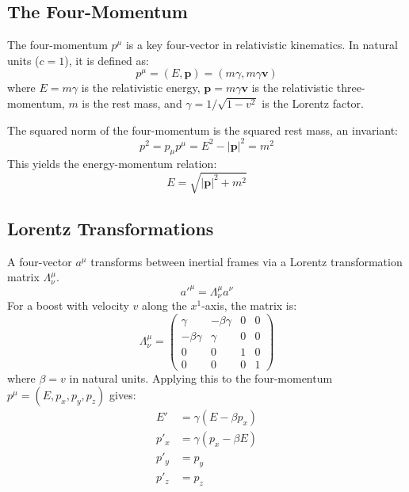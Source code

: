 \documentclass[a4paper,oneside,article]{memoir}
\begin{document}
\subsection{The Four-Momentum}
The four-momentum $p^\mu$ is a key four-vector in relativistic kinematics. In natural units ($c=1$), it is defined as:
\begin{equation}
p^\mu = (E, \mathbf{p}) = (m\gamma, m\gamma\mathbf{v}) \label{eq:4momentum} \tag{2.40}
\end{equation}
where $E = m\gamma$ is the relativistic energy, $\mathbf{p} = m\gamma\mathbf{v}$ is the relativistic three-momentum, $m$ is the rest mass, and $\gamma = 1/\sqrt{1 - v^2}$ is the Lorentz factor.

The squared norm of the four-momentum is the squared rest mass, an invariant:
\[
p^2 = p_\mu p^\mu = E^2 - |\mathbf{p}|^2 = m^2
\]
This yields the energy-momentum relation:
\begin{equation}
E = \sqrt{|\mathbf{p}|^2 + m^2} \label{eq:emrelation} \tag{2.58}
\end{equation}

\subsection{Lorentz Transformations}
A four-vector $a^\mu$ transforms between inertial frames via a Lorentz transformation matrix $\Lambda^\mu_\nu$.
\[
a'^\mu = \Lambda^\mu_\nu a^\nu
\]
For a boost with velocity $v$ along the $x^1$-axis, the matrix is:
\[
\Lambda^\mu_\nu = \begin{pmatrix} \gamma & -\beta\gamma & 0 & 0 \\ -\beta\gamma & \gamma & 0 & 0 \\ 0 & 0 & 1 & 0 \\ 0 & 0 & 0 & 1 \end{pmatrix}
\]
where $\beta = v$ in natural units. Applying this to the four-momentum $p^\mu=(E, p_x, p_y, p_z)$ gives:
\begin{align*}
E' &= \gamma(E - \beta p_x) \\
p'_x &= \gamma(p_x - \beta E) \\
p'_y &= p_y \\
p'_z &= p_z
\end{align*}
\end{document}
